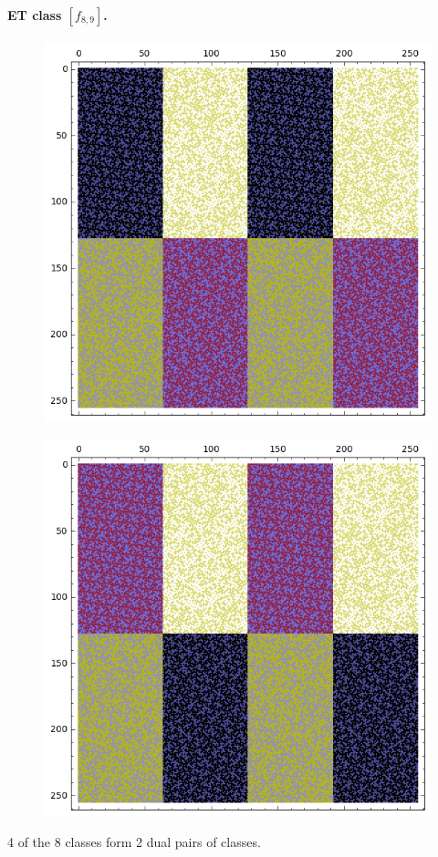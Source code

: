 \documentclass[12pt,a4paper]{article}
\begin{document}
\paragraph*{ET class $[f_{8,9}]$.}
\begin{figure}[!hb]
\centering
\begin{minipage}{.48\textwidth}
  \centering
  \includegraphics[width=.9\linewidth]{../matrix_plot/re8_9_bent_cayley_graph_index_matrix.png}
  \label{fig:c8_9_bent_cayley_graph_index_matrix}
\end{minipage}
\begin{minipage}{.48\textwidth}
  \centering
  \includegraphics[width=.9\linewidth]{../matrix_plot/re8_9_dual_cayley_graph_index_matrix.png}
  \label{fig:c8_9_dual_cayley_graph_index_matrix}
\end{minipage}%
\end{figure}
4 of the 8 classes form 2 dual pairs of classes.
\end{document}
